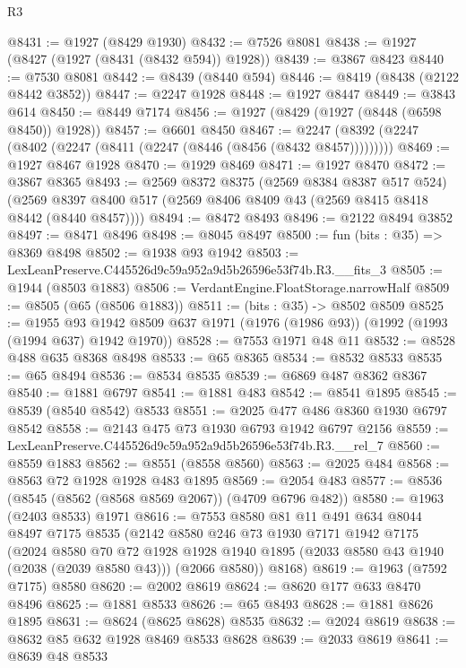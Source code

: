 \begin{lexlean}{R3}
\begin{coremodule}
@8431 := @1927 (@8429 @1930)
@8432 := @7526 @8081
@8438 := @1927 (@8427 (@1927 (@8431 (@8432 @594)) @1928))
@8439 := @3867 @8423
@8440 := @7530 @8081
@8442 := @8439 (@8440 @594)
@8446 := @8419 (@8438 (@2122 @8442 @3852))
@8447 := @2247 @1928
@8448 := @1927 @8447
@8449 := @3843 @614
@8450 := @8449 @7174
@8456 := @1927 (@8429 (@1927 (@8448 (@6598 @8450)) @1928))
@8457 := @6601 @8450
@8467 := @2247 (@8392 (@2247 (@8402 (@2247 (@8411 (@2247 (@8446 (@8456 (@8432 @8457)))))))))
@8469 := @1927 @8467 @1928
@8470 := @1929 @8469
@8471 := @1927 @8470
@8472 := @3867 @8365
@8493 := @2569
    @8372
    @8375
    (@2569 @8384 @8387 @517 @524)
    (@2569 @8397 @8400 @517 (@2569 @8406 @8409 @43 (@2569 @8415 @8418 @8442 (@8440 @8457))))
@8494 := @8472 @8493
@8496 := @2122 @8494 @3852
@8497 := @8471 @8496
@8498 := @8045 @8497
@8500 := fun (bits : @35) => @8369 @8498
@8502 := @1938 @93 @1942
@8503 := LexLeanPreserve.C445526d9c59a952a9d5b26596e53f74b.R3.__fits_3
@8505 := @1944 (@8503 @1883)
@8506 := VerdantEngine.FloatStorage.narrowHalf
@8509 := @8505 (@65 (@8506 @1883))
@8511 := (bits : @35) -> @8502 @8509
@8525 := @1955
    @93
    @1942
    @8509
    @637
    @1971
    (@1976 (@1986 @93))
    (@1992 (@1993 (@1994 @637) @1942 @1970))
@8528 := @7553 @1971 @48 @11
@8532 := @8528 @488 @635 @8368 @8498
@8533 := @65 @8365
@8534 := @8532 @8533
@8535 := @65 @8494
@8536 := @8534 @8535
@8539 := @6869 @487 @8362 @8367
@8540 := @1881 @6797
@8541 := @1881 @483
@8542 := @8541 @1895
@8545 := @8539 (@8540 @8542) @8533
@8551 := @2025 @477 @486 @8360 @1930 @6797 @8542
@8558 := @2143 @475 @73 @1930 @6793 @1942 @6797 @2156
@8559 := LexLeanPreserve.C445526d9c59a952a9d5b26596e53f74b.R3.__rel_7
@8560 := @8559 @1883
@8562 := @8551 (@8558 @8560)
@8563 := @2025 @484
@8568 := @8563 @72 @1928 @1928 @483 @1895
@8569 := @2054 @483
@8577 := @8536 (@8545 (@8562 (@8568 @8569 @2067)) (@4709 @6796 @482))
@8580 := @1963 (@2403 @8533) @1971
@8616 := @7553
    @8580
    @81
    @11
    @491
    @634
    @8044
    @8497
    @7175
    @8535
    (@2142
      @8580
      @246
      @73
      @1930
      @7171
      @1942
      @7175
      (@2024
        @8580
        @70
        @72
        @1928
        @1928
        @1940
        @1895
        (@2033 @8580 @43 @1940 (@2038 (@2039 @8580 @43)))
        (@2066 @8580))
      @8168)
@8619 := @1963 (@7592 @7175) @8580
@8620 := @2002 @8619
@8624 := @8620 @177 @633 @8470 @8496
@8625 := @1881 @8533
@8626 := @65 @8493
@8628 := @1881 @8626 @1895
@8631 := @8624 (@8625 @8628) @8535
@8632 := @2024 @8619
@8638 := @8632 @85 @632 @1928 @8469 @8533 @8628
@8639 := @2033 @8619
@8641 := @8639 @48 @8533

\end{coremodule}
\end{lexlean}
